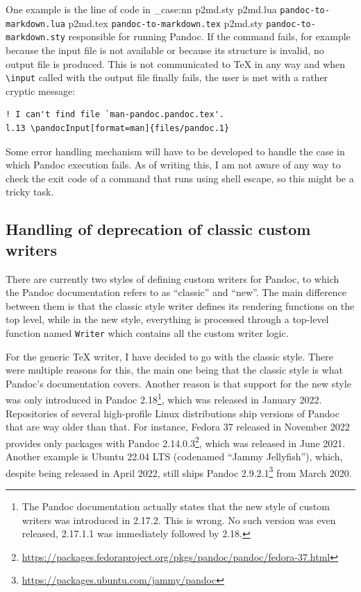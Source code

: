\documentclass[
  digital,     %
  oneside,     %
  nosansbold,  %
  nocolorbold, %
  lof,         %
  nolot,       %
]{fithesis4}
\newcommand\macro[1]{\texttt{\textbackslash{}{#1}}}
\newcommand\file[1]
  {
    \str_case:nn
      { #1 }
      {
        { p2md.lua } { \texttt{pandoc\hyp{}to\hyp{}markdown.lua} }
        { p2md.tex } { \texttt{pandoc\hyp{}to\hyp{}markdown.tex} }
        { p2md.sty } { \texttt{pandoc\hyp{}to\hyp{}markdown.sty} }
      }
  }
\begin{document}
One example is the line of code in \file{p2md.sty} responsible for running Pandoc. If the command fails, for example because the input file is not available or because its structure is invalid, no output file is produced. This is not communicated to \TeX{} in any way and when \macro{input} called with the output file finally fails, the user is met with a rather cryptic message:

\noindent
\lstset{language=}
\begin{lstlisting}
! I can't find file `man-pandoc.pandoc.tex'.
l.13 \pandocInput[format=man]{files/pandoc.1}
\end{lstlisting}

\noindent
Some error handling mechanism will have to be developed to handle the case in which Pandoc execution fails. As of writing this, I am not aware of any way to check the exit code of a command that runs using shell escape, so this might be a tricky task.

\subsection{Handling of deprecation of classic custom writers}
There are currently two styles of defining custom writers for Pandoc, to which the Pandoc documentation refers to as ``classic'' and ``new''. The main difference between them is that the classic style writer defines its rendering functions on the top level, while in the new style, everything is processed through a top-level function named \texttt{Writer} which contains all the custom writer logic.

For the generic \TeX{} writer, I have decided to go with the classic style. There were multiple reasons for this, the main one being that the classic style is what Pandoc's documentation covers. Another reason is that support for the new style was only introduced in Pandoc 2.18\footnote{The Pandoc documentation actually states that the new style of custom writers was introduced in 2.17.2. This is wrong. No such version was even released, 2.17.1.1 was immediately followed by 2.18.}, which was released in January 2022. Repositories of several high-profile Linux distributions ship versions of Pandoc that are way older than that. For instance, Fedora 37 released in November 2022 provides only packages with Pandoc 2.14.0.3\footnote{\url{https://packages.fedoraproject.org/pkgs/pandoc/pandoc/fedora-37.html}}, which was released in June 2021. Another example is Ubuntu 22.04 LTS (codenamed ``Jammy Jellyfish''), which, despite being released in April 2022, still ships Pandoc 2.9.2.1\footnote{\url{https://packages.ubuntu.com/jammy/pandoc}} from March 2020.
\end{document}
